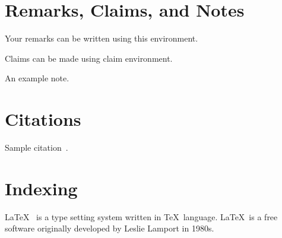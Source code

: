\section{Remarks, Claims, and Notes}
\label{sec:remarks}

\begin{remark}
  \label{rem:remark1}
  Your remarks can be written using this environment.
\end{remark}

\begin{claim}
  \label{clm:claim1}
  Claims can be made using claim environment.
\end{claim}

\begin{note}
  An example note.
\end{note}


\section{Citations}\label{sec:citations}
Sample citation~\cite{lamport1994latex}.

\section{Indexing}\label{sec:indexing} \LaTeX\  is a 
type setting system written in \TeX\ language. \LaTeX\ 
is a free software originally developed by 
Leslie Lamport in 1980s. 



